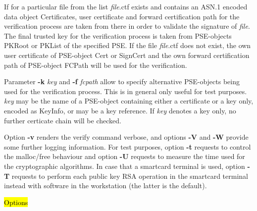 If for a particular file from the list {\em file}.ctf exists and contains an ASN.1 encoded data object Certificates, 
user certificate and forward 
certification path for the verification process are taken from there in order to validate the signature
of {\em file}. The final trusted key for 
the verification process is taken from PSE-objects PKRoot or PKList of the specified PSE.
If the file {\em file}.ctf does not exist, the own user certificate of PSE-object Cert or SignCert and
the own forward certification path of PSE-object FCPath will be used for the verification.

Parameter {\bf -k} {\em key} and {\bf -f} {\em fcpath} allow to specify 
alternative PSE-objects being used for the verification process. This is in general only useful for
test purposes. {\em key} may be the name of a PSE-object containing either a certificate
or a key only, encoded as KeyInfo, or may be a key reference. If {\em key} denotes a key only,
no further certicate chain will be checked.

Option {\bf -v} renders the verify command verbose, and options {\bf -V} and {\bf -W} provide some
further logging information. For test purposes, option {\bf -t} requests
to control the malloc/free behaviour and option {\bf -U} requests to measure the time used for the 
cryptographic
algorithms. In case that a smartcard terminal is used, option {\bf -T} requests to perform each public key 
RSA operation in the smartcard terminal instead with software in the workstation (the latter is the 
default). 

 
\hl{Options}






